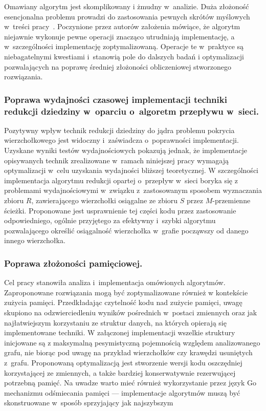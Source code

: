   Omawiany algorytm jest skomplikowany i żmudny w~analizie.
  Duża złożoność esencjonalna problemu prowadzi do zastosowania pewnych skrótów myślowych w~treści pracy~\cite{ImprovedBounds10}.
  Poczynione przez autorów założenia mówiące, że algorytm niejawnie wykonuje pewne operacji znacząco utrudniają implementację, a w~szczególności implementację zoptymalizowaną.
  Operacje te w~praktyce są niebagatelnymi kwestiami i~stanowią pole do dalszych badań i optymalizacji pozwalających na poprawę średniej złożoności obliczeniowej stworzonego rozwiązania.

  \subsubsection{\textbf{Poprawa wydajności czasowej implementacji techniki redukcji dziedziny w~oparciu o~algoretm przepływu w~sieci.}}

  Pozytywny wpływ technik redukcji dziedziny do jądra problemu pokrycia wierzchołkowego jest widoczny i~zaświadcza o~poprawności implementacji.
  Uzyskane wyniki testów wydajnościowych pokazują jednak, że implementacje opisywanych technik zrealizowane w~ramach niniejszej pracy wymagają optymalizacji w~celu uzyskania wydajności bliższej teoretycznej.
  W szczególności implementacja algorytmu redukcji opartej o~przepływ w~sieci boryka się z problemami wydajnościowymi w~związku z~zastosowanym sposobem wyznaczania zbioru $R$, zawierającego wierzchołki osiągalne ze zbioru $S$ przez $M$-przemienne ścieżki.
  Proponowane jest usprawnienie tej części kodu przez zastosowanie odpowiedniego, ogólnie przyjętego za efektywny i~szybki algorytmu pozwalającego określić osiągalność wierzchołka w~grafie począwszy od danego innego wierzchołka.

  \subsubsection{\textbf{Poprawa złożoności pamięciowej.}}

  Cel pracy stanowiła analiza i~implementacja omówionych algorytmów.
  Zaproponowane rozwiązania mogą być zoptymalizowane również w kontekście zużycia pamięci.
  Przedkładając czytelność kodu nad zużycie pamięci, uwagę skupiono na odzwierciedleniu wyników pośrednich w~postaci zmiennych oraz jak najłatwiejszym korzystaniu ze struktur danych, na których opierają się implementowane techniki.
  W załączonej implementacji wszelkie struktury inicjowane są z maksymalną pesymistyczną pojemnością względem analizowanego grafu, nie biorąc pod uwagę na przykład wierzchołków czy krawędzi usuniętych z~grafu.
  Proponowaną optymalizacją jest stworzenie wersji kodu oszczędniej korzystającej ze zmiennych, a także bardziej konserwatywnie rezerwującej potrzebną pamięć.
  Na uwadze warto mieć również wykorzystanie przez język Go mechanizmu odśmiecania pamięci --- implementacje algorytmów muszą być skonstruowane w~sposób sprzyjający jak najszybszym 

